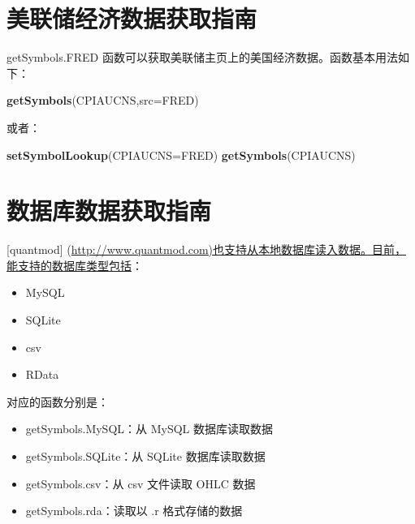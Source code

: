 \documentclass[]{ctexbook}
\newenvironment{Shaded}{\begin{snugshade}}{\end{snugshade}}
\newcommand{\AttributeTok}[1]{\textcolor[rgb]{0.13,0.29,0.53}{#1}}
\newcommand{\FunctionTok}[1]{\textcolor[rgb]{0.13,0.29,0.53}{\textbf{#1}}}
\newcommand{\NormalTok}[1]{#1}
\newcommand{\StringTok}[1]{\textcolor[rgb]{0.31,0.60,0.02}{#1}}
\providecommand{\tightlist}{%
  \setlength{\itemsep}{0pt}\setlength{\parskip}{0pt}}
\begin{document}
\section{美联储经济数据获取指南}\label{ux7f8eux8054ux50a8ux7ecfux6d4eux6570ux636eux83b7ux53d6ux6307ux5357}

getSymbols.FRED 函数可以获取美联储主页上的美国经济数据。函数基本用法如下：

\begin{Shaded}
\begin{Highlighting}[]
\FunctionTok{getSymbols}\NormalTok{(}\StringTok{\textquotesingle{}CPIAUCNS\textquotesingle{}}\NormalTok{,}\AttributeTok{src=}\StringTok{\textquotesingle{}FRED\textquotesingle{}}\NormalTok{)}
\end{Highlighting}
\end{Shaded}

或者：

\begin{Shaded}
\begin{Highlighting}[]
\FunctionTok{setSymbolLookup}\NormalTok{(}\AttributeTok{CPIAUCNS=}\StringTok{\textquotesingle{}FRED\textquotesingle{}}\NormalTok{)}
\FunctionTok{getSymbols}\NormalTok{(}\StringTok{\textquotesingle{}CPIAUCNS\textquotesingle{}}\NormalTok{)}
\end{Highlighting}
\end{Shaded}

\section{数据库数据获取指南}\label{ux6570ux636eux5e93ux6570ux636eux83b7ux53d6ux6307ux5357}

{[}quantmod{]} (\url{http://www.quantmod.com)也支持从本地数据库读入数据。目前，能支持的数据库类型包括}：

\begin{itemize}
\tightlist
\item
  MySQL
\item
  SQLite
\item
  csv
\item
  RData
\end{itemize}

对应的函数分别是：

\begin{itemize}
\tightlist
\item
  getSymbols.MySQL：从 MySQL 数据库读取数据
\item
  getSymbols.SQLite：从 SQLite 数据库读取数据
\item
  getSymbols.csv：从 csv 文件读取 OHLC 数据
\item
  getSymbols.rda：读取以 .r 格式存储的数据
\end{itemize}
\end{document}
